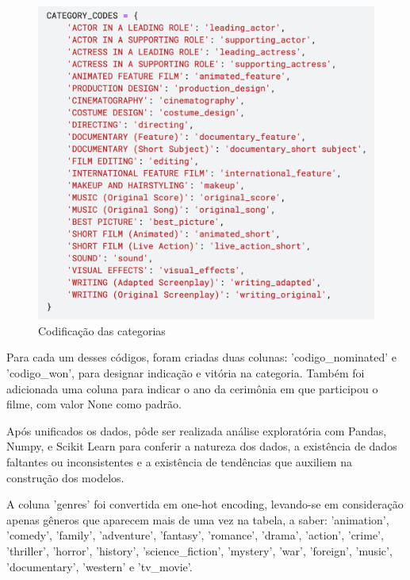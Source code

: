             \begin{figure}[htb]
            	\caption{\label{cat_cods}Codificação das categorias}
            	\begin{center}
            		\includegraphics[scale=0.7]{categ_codes.png}
            	\end{center}
            \end{figure}

            Para cada um desses códigos, foram criadas duas colunas: '{codigo}\_nominated' e '{codigo}\_won', para designar indicação e vitória na categoria. Também foi adicionada uma coluna para indicar o ano da cerimônia em que participou o filme, com valor None como padrão.\newline

            Após unificados os dados, pôde ser realizada análise exploratória com Pandas, Numpy, e Scikit Learn para conferir a natureza dos dados, a existência de dados faltantes ou inconsistentes e a existência de tendências que auxiliem na construção dos modelos.\newline

            A coluna 'genres' foi convertida em one-hot encoding, levando-se em consideração apenas gêneros que aparecem mais de uma vez na tabela, a saber: 'animation', 'comedy', 'family', 'adventure', 'fantasy', 'romance', 'drama', 'action', 'crime', 'thriller', 'horror', 'history', 'science\_fiction', 'mystery', 'war', 'foreign', 'music', 'documentary', 'western' e 'tv\_movie'.

